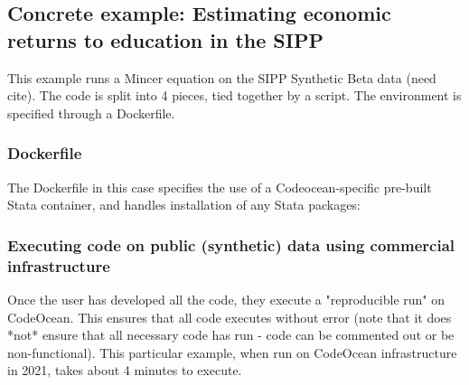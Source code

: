 \documentclass[]{hdsr}
\begin{document}
\subsection{Concrete example: Estimating economic returns to education in the SIPP}

This example runs a Mincer equation on the SIPP Synthetic Beta data (need cite). The code is split into 4 pieces, tied together by a script. The environment is specified through a Dockerfile. 







\subsubsection{Dockerfile}

The Dockerfile in this case specifies the use of a Codeocean-specific pre-built Stata container, and handles installation of any Stata packages:



\subsubsection{Executing code on public (synthetic) data using commercial infrastructure}

Once the user has developed all the code, they execute a "reproducible run" on CodeOcean. This ensures that all code executes without error (note that it does *not* ensure that all necessary code has run - code can be commented out or be non-functional). This particular example, when run on CodeOcean infrastructure in 2021, takes about 4 minutes to execute.
\end{document}
